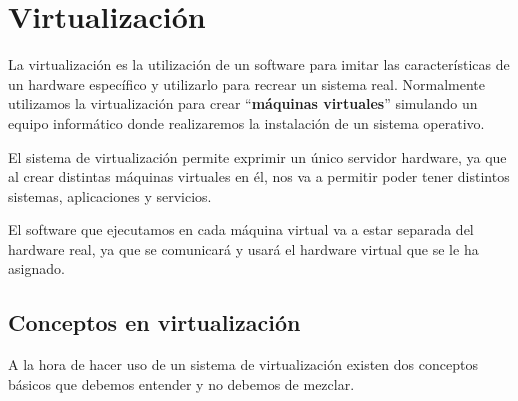 \chapter{Virtualización}

La virtualización es la utilización de un software para imitar las características de un hardware específico y utilizarlo para recrear un sistema real. Normalmente utilizamos la virtualización para crear “\textbf{máquinas virtuales}” simulando un equipo informático donde realizaremos la instalación de un sistema operativo.

El sistema de virtualización permite exprimir un único servidor hardware, ya que al crear distintas máquinas virtuales en él, nos va a permitir poder tener distintos sistemas, aplicaciones y servicios.

El software que ejecutamos en cada máquina virtual va a estar separada del hardware real, ya que se comunicará y usará el hardware virtual que se le ha asignado.

\section{Conceptos en virtualización}

A la hora de hacer uso de un sistema de virtualización existen dos conceptos básicos que debemos entender y no debemos de mezclar.


